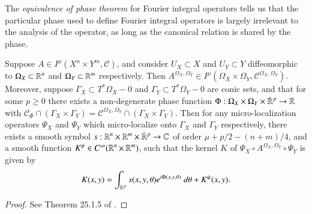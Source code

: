 The \emph{equivalence of phase theorem} for Fourier integral operators tells us that the particular phase used to define Fourier integral operators is largely irrelevant to the analysis of the operator, as long as the canonical relation is shared by the phase.
%
%
%

\begin{theorem} \label{thm:equivalenceofphase}
  Suppose $A \in I^\mu(X^n \times Y^m, \mathcal{C})$, and consider $U_X \subset X$ and $U_Y \subset Y$ diffeomorphic to $\Omega_X \subset \operatorname{\mathbb{R}}^n$ and $\Omega_Y \subset \operatorname{\mathbb{R}}^m$ respectively. Then $A^{\Omega_X,\Omega_Y} \in I^\mu(\Omega_X \times \Omega_Y, \mathcal{C}^{\Omega_X,\Omega_Y})$. Moreover, suppose $\Gamma_X \subset T^* \Omega_X - 0$ and $\Gamma_Y \subset T^* \Omega_Y - 0$ are conic sets, and that for some $p \geq 0$ there exists a non-degenerate phase function $\Phi: \Omega_X \times {\Omega_Y} \times {\dot{\RR}{\vphantom{\RR}}^p} \to \RR$ with $\mathcal{C}_\Phi \cap (\Gamma_X \times \Gamma_Y) = \mathcal{C}^{\Omega_X,\Omega_Y} \cap (\Gamma_X \times \Gamma_Y)$. Then for any micro-localization operators $\Psi_X$ and $\Psi_Y$ which micro-localize onto $\Gamma_X$ and $\Gamma_Y$ respectively, there exists a smooth symbol $s: {\RR^n} \times {\RR^m} \times {\dot{\RR}{\vphantom{\RR}}^p} \to \CC$ of order $\mu + p/2 - (n+m)/4$, and a smooth function $K^{\psi} \in C^\infty(\operatorname{\mathbb{R}}^n \times \operatorname{\mathbb{R}}^m)$, such that the kernel $K$ of $\Psi_X \circ A^{\Omega_X,\Omega_Y} \circ \Psi_Y$ is given by
  \[ K(x,y) = \int_{\operatorname{\mathbb{R}}^p} s(x,y,\theta) e^{i \Phi(x,y,\theta)}\; d\theta + K^\psi(x,y). \]
\end{theorem}
\begin{proof}
  See Theorem 25.1.5 of \cite{Hormander4}.
\end{proof}

